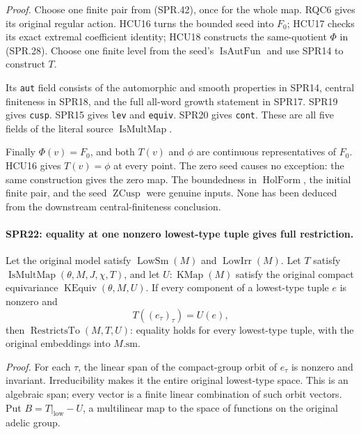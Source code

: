 \emph{Proof.}
Choose one finite pair from (SPR.42), once for the whole map.
RQC6 gives its original regular action.
HCU16 turns the bounded seed into \(F_0\);
HCU17 checks its exact extremal coefficient identity;
HCU18 constructs the same-quotient \(\Phi\) in (SPR.28).
Choose one finite level from the seed's
\(\operatorname{IsAutFun}\) and use SPR14 to construct \(T\).

Its \texttt{aut} field consists of the automorphic and smooth
properties in SPR14, central finiteness in SPR18, and the
full all-word growth statement in SPR17.
SPR19 gives \texttt{cusp}.
SPR15 gives \texttt{lev} and \texttt{equiv}.
SPR20 gives \texttt{cont}.
These are all five fields of the literal source
\(\operatorname{IsMultMap}\).

Finally \(\Phi(v)=F_0\), and both \(T(v)\) and \(\phi\) are
continuous representatives of \(F_0\).
HCU16 gives \(T(v)=\phi\) at every point.
The zero seed causes no exception: the same construction gives
the zero map.
The boundedness in \(\operatorname{HolForm}\), the initial
finite pair, and the seed \(\operatorname{ZCusp}\) were genuine
inputs.  None has been deduced from the downstream
central-finiteness conclusion.

\paragraph{SPR22: equality at one nonzero lowest-type tuple gives full restriction.}
\label{claim:SPR22}
Let the original model satisfy \(\operatorname{LowSm}(M)\) and
\(\operatorname{LowIrr}(M)\).  Let \(T\) satisfy
\(\operatorname{IsMultMap}(\theta,M,J,\chi,T)\), and let
\(U:\operatorname{KMap}(M)\) satisfy the original compact
equivariance \(\operatorname{KEquiv}(\theta,M,U)\).
If every component of a lowest-type tuple \(e\) is nonzero and
\[
       T((e_\tau)_\tau)=U(e),
 \tag{SPR.44}
\]
then \(\operatorname{RestrictsTo}(M,T,U)\): equality holds for
every lowest-type tuple, with the original embeddings into
\(M.\mathrm{sm}\).

\emph{Proof.}
For each \(\tau\), the linear span of the compact-group orbit of
\(e_\tau\) is nonzero and invariant.  Irreducibility makes it
the entire original lowest-type space.  This is an algebraic
span; every vector is a finite linear combination of such orbit
vectors.  Put \(B=T|_{\mathrm{low}}-U\), a multilinear map to
the space of functions on the original adelic group.

